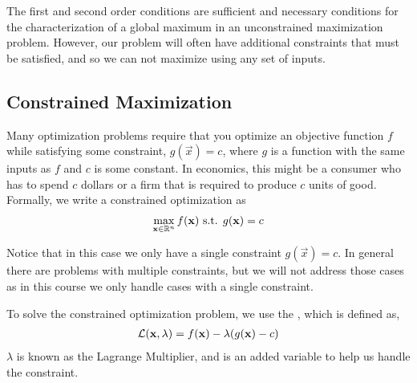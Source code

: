The first and second order conditions are sufficient and necessary conditions for the characterization of a global maximum in an unconstrained maximization problem. However, our problem will often have additional constraints that must be satisfied, and so we can not maximize using any set of inputs.

\subsection*{Constrained Maximization} \label{sec:constrained_maximization}
Many optimization problems require that you optimize an objective function $f$ while satisfying some constraint, $g(\vec{x}) = c$, where $g$ is a function with the same inputs as $f$ and $c$ is some constant. In economics, this might be a consumer who has to spend $c$ dollars or a firm that is required to produce $c$ units of good. Formally, we write a constrained optimization as
\begin{align*}
    \max_{\mathbf{x} \in \mathbb{R}^n} f(\mathbf{x}) \text{ s.t. } g(\mathbf{x}) = c
\end{align*}

Notice that in this case we only have a single constraint $g(\vec{x}) = c$. In general there are problems with multiple constraints, but we will not address those cases as in this course we only handle cases with a single constraint. 

To solve the constrained optimization problem, we use the , which is defined as,
\begin{align*}
    \mathcal{L}(\mathbf{x}, \lambda) = f(\mathbf{x}) - \lambda(g(\mathbf{x}) - c)
\end{align*}
$\lambda$ is known as the Lagrange Multiplier, and is an added variable to help us handle the constraint. 

